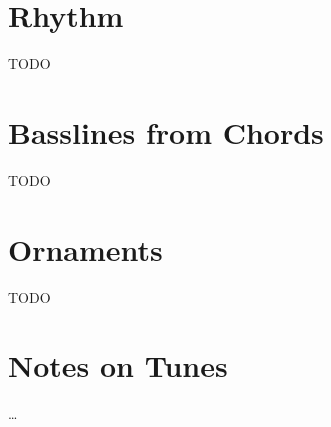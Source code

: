 
\section{Rhythm}
TODO

\section{Basslines from Chords}
TODO

\section{Ornaments}
TODO

\section{Notes on Tunes}
\begin{description}[noitemsep]
\item[TODO] \dots
\end{description}


